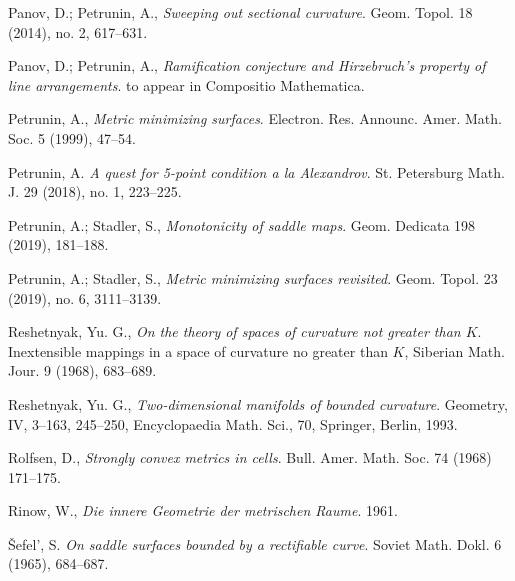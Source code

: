 \begin{thebibliography}{52}
Panov, D.; Petrunin, A.,
\textit{Sweeping out sectional curvature}. 
Geom. Topol. 
18 
(2014), 
no. 2, 
617--631. 

Panov, D.; Petrunin, A.,
\textit{Ramification conjecture and Hirzebruch's property of line arrangements}.
to appear in Compositio Mathematica.

Petrunin, A.,
\textit{Metric minimizing surfaces}.
Electron. Res. Announc. Amer. Math. Soc. 
5 
(1999), 
47--54.

Petrunin, A. 
\textit{A quest for 5-point condition a la Alexandrov}.
St. Petersburg Math. J. 29 (2018), no. 1, 223--225.

Petrunin, A.; 
Stadler, S., 
\textit{Monotonicity of saddle maps}.
 Geom. Dedicata 198 (2019), 181--188.

Petrunin, A.; 
Stadler, S., 
\textit{Metric minimizing surfaces revisited}.
Geom. Topol. 23 (2019), no. 6, 3111--3139.

Reshetnyak, Yu. G.,
\textit{On the theory of spaces of curvature not greater than $K$}.
Inextensible mappings in a space of curvature
no greater than $K$, Siberian Math. Jour. 9 (1968), 683--689.

Reshetnyak, Yu. G., 
\textit{Two-dimensional manifolds of bounded curvature}.
Geometry, IV, 3--163, 245--250, Encyclopaedia Math. Sci., 70, Springer, Berlin, 1993.

Rolfsen, D.,
\textit{Strongly convex metrics in cells}.
Bull. Amer. Math. Soc. 74 (1968) 171–175.

Rinow, W., 
\textit{Die innere Geometrie der metrischen Raume}.
1961.

\v{S}efel', S.
\textit{On saddle surfaces bounded by a rectifiable curve}.
Soviet Math. Dokl. 6 (1965), 684--687.



\end{thebibliography}
